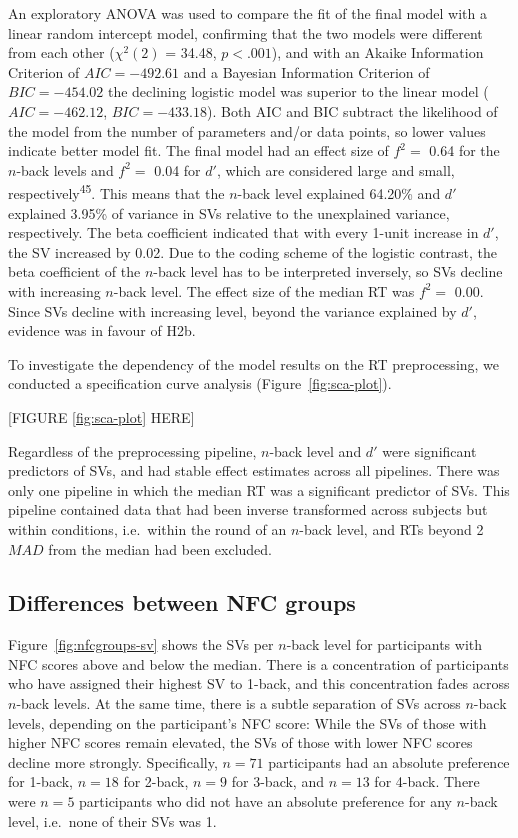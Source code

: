 \documentclass[
  man,floatsintext]{apa6}
\begin{document}
An exploratory ANOVA was used to compare the fit of the final model with a linear random intercept model, confirming that the two models were different from each other (\(\chi^2 (2)\) = 34.48, \(p<.001\)), and with an Akaike Information Criterion of \(AIC=-492.61\) and a Bayesian Information Criterion of \(BIC=-454.02\) the declining logistic model was superior to the linear model (\(AIC=-462.12\), \(BIC=-433.18\)).
Both AIC and BIC subtract the likelihood of the model from the number of parameters and/or data points, so lower values indicate better model fit.
The final model had an effect size of \(f^{2}=\) 0.64 for the \(n\)-back levels and \(f^{2}=\) 0.04 for \(d'\), which are considered large and small, respectively\textsuperscript{45}.
This means that the \(n\)-back level explained 64.20\% and \(d'\) explained 3.95\% of variance in SVs relative to the unexplained variance, respectively.
The beta coefficient indicated that with every 1-unit increase in \(d'\), the SV increased by 0.02.
Due to the coding scheme of the logistic contrast, the beta coefficient of the \(n\)-back level has to be interpreted inversely, so SVs decline with increasing \(n\)-back level.
The effect size of the median RT was \(f^{2}=\) 0.00.
Since SVs decline with increasing level, beyond the variance explained by \(d'\), evidence was in favour of H2b.

To investigate the dependency of the model results on the RT preprocessing, we conducted a specification curve analysis (Figure~\ref{fig:sca-plot}).

{[}FIGURE \ref{fig:sca-plot} HERE{]}

Regardless of the preprocessing pipeline, \(n\)-back level and \(d'\) were significant predictors of SVs, and had stable effect estimates across all pipelines.
There was only one pipeline in which the median RT was a significant predictor of SVs.
This pipeline contained data that had been inverse transformed across subjects but within conditions, i.e.~within the round of an \(n\)-back level, and RTs beyond 2 \(MAD\) from the median had been excluded.

\hypertarget{differences-between-nfc-groups}{%
\subsection{Differences between NFC groups}\label{differences-between-nfc-groups}}

Figure~\ref{fig:nfcgroups-sv} shows the SVs per \(n\)-back level for participants with NFC scores above and below the median.
There is a concentration of participants who have assigned their highest SV to 1-back, and this concentration fades across \(n\)-back levels.
At the same time, there is a subtle separation of SVs across \(n\)-back levels, depending on the participant's NFC score: While the SVs of those with higher NFC scores remain elevated, the SVs of those with lower NFC scores decline more strongly.
Specifically, \(n=71\) participants had an absolute preference for 1-back, \(n=18\) for 2-back, \(n=9\) for 3-back, and \(n=13\) for 4-back.
There were \(n=5\) participants who did not have an absolute preference for any \(n\)-back level, i.e.~none of their SVs was 1.
\end{document}
